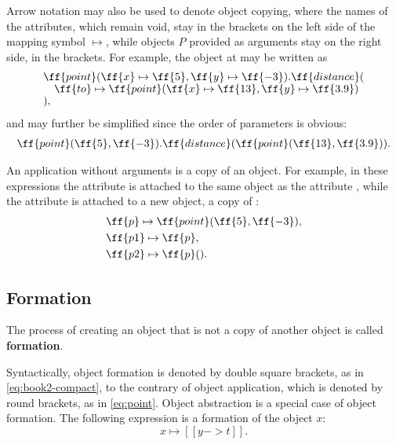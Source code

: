 Arrow notation may also be used to denote object copying,
where the names of the attributes, which remain void, stay in the brackets
on the left side of the mapping symbol \(\mapsto\),
while objects \(P\) provided as arguments stay on the right side,
in the brackets. For example, the object at  may be written as
\begin{equation}\label{eq:point}
\begin{split}
& \ff{point}(\ff{x} \mapsto \ff{5}, \ff{y} \mapsto \ff{-3}).\ff{distance}(\br
& \quad \ff{to} \mapsto \ff{point}(\ff{x} \mapsto \ff{13}, \ff{y} \mapsto \ff{3.9}) \br
& ),
\end{split}
\end{equation}
and may further be simplified since the order of parameters is obvious:
\begin{equation}
\begin{split}
\ff{point}(\ff{5}, \ff{-3}).\ff{distance}(\ff{point}(\ff{13}, \ff{3.9})).
\end{split}
\end{equation}

An application without arguments is a copy of an object. For example,
in these expressions the attribute  is attached to the same object
as the attribute , while the attribute  is attached to a new
object, a copy of :
\begin{equation*}
\begin{split}
& \ff{p} \mapsto \ff{point}(\ff{5}, \ff{-3}),\\
& \ff{p1} \mapsto \ff{p},\\
& \ff{p2} \mapsto \ff{p}().\\
\end{split}
\end{equation*}

\subsection{Formation}

\begin{definition}\label{def:formation}
The process of creating an object that is not a copy of another object
is called \textbf{formation}.
\end{definition}

Syntactically, object formation is denoted by double square brackets,
as in \cref{eq:book2-compact}, to the contrary of object application,
which is denoted by round brackets, as in \cref{eq:point}.
Object abstraction is a special case of object formation.
The following expression is a formation of the object \(x\):
\begin{equation*}
x \mapsto [[ y -> t ]].
\end{equation*}


